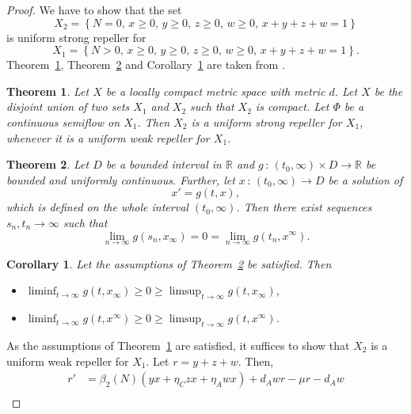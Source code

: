 \documentclass{my_aims}
\newtheorem{theorem}{Theorem}[section]
\newtheorem{corollary}{Corollary}
\theoremstyle{definition}
\begin{document}
\begin{proof}
We have to show that the set
\begin{equation*}
X_2 = \left\{ N = 0, \, x \geq 0 , \, y \geq 0 , \, z \geq 0, \,
w \geq 0 , \, x + y + z + w = 1 \right\}
\end{equation*}
is uniform strong repeller for
\begin{equation*}
X_1 = \left\{ N > 0, \, x \geq 0 , \, y \geq 0 , \, z \geq 0,
\, w \geq 0 , \, x + y + z + w = 1  \right\}.
\end{equation*}
Theorem~\ref{theo:auxiliar1}, Theorem~\ref{theo:auxiliar2} and Corollary~\ref{cor:auxiliar3}
are taken from \cite{Bhunu:BMB:2009:HIV:TB,Thieme:1993}.
\begin{theorem}
\label{theo:auxiliar1}
Let $X$ be a locally compact metric space with metric $d$. Let $X$ be the disjoint
union of two sets $X_1$ and $X_2$ such that $X_2$ is compact. Let $\Phi$ be a continuous
semiflow on $X_1$. Then $X_2$ is a uniform strong repeller for $X_1$,
whenever it is a uniform weak repeller for $X_1$.
\end{theorem}
\begin{theorem}
\label{theo:auxiliar2}
Let $D$ be a bounded interval in ${\mathbb{R}}$ and $g \, : \, (t_0, \infty) \times D \to {\mathbb{R}}$
be bounded and uniformly continuous. Further, let $x \, : \, (t_0, \infty) \to D$ be a solution of
$$
x' = g(t, x),
$$
which is defined on the whole interval $(t_0, \infty)$.
Then there exist sequences $s_n, t_n \to \infty$ such that
$$
\lim_{n \to \infty} g(s_n, x_\infty) = 0
= \lim_{n \to \infty} g(t_n, x^\infty).
$$
\end{theorem}
\begin{corollary}
\label{cor:auxiliar3}
Let the assumptions of Theorem~\ref{theo:auxiliar2} be satisfied. Then
\begin{itemize}
\item[a)] $\liminf_{t \to \infty} g(t, x_\infty) \geq 0 \geq \limsup_{t \to \infty} g(t, x_\infty)$,
\item[b)] $\liminf_{t \to \infty} g(t, x^\infty) \geq 0 \geq \limsup_{t \to \infty} g(t, x^\infty)$.
\end{itemize}
\end{corollary}
As the assumptions of Theorem~\ref{theo:auxiliar1} are satisfied, it suffices to show
that $X_2$ is a uniform weak repeller for $X_1$. Let $r = y + z + w$. Then,
\begin{equation*}
\begin{split}
r' &= \beta_2(N)(yx + \eta_C zx + \eta_A wx) + d_A w r - \mu r - d_A w \\

\end{split}
\end{equation*}
\end{proof}
\end{document}
